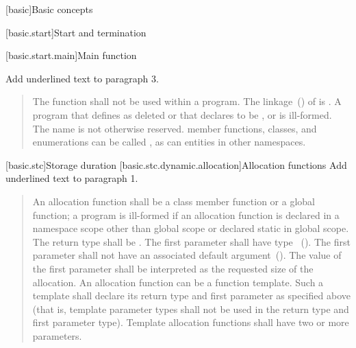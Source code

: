 
\setcounter{chapter}{2}
[basic]{Basic concepts}

\setcounter{section}{5}
[basic.start]{Start and termination}

[basic.start.main]{Main function}

Add underlined text to paragraph 3.


\begin{quote}
	\setcounter{Paras}{4}


The function  shall not be used within
a program.
%
The linkage~() of  is
. A program that defines  as
deleted or that declares  to be
 , or  is ill-formed. 
The name  is
not otherwise reserved. \enterexample member functions, classes, and
enumerations can be called , as can entities in other
namespaces. \exitexample
\end{quote}

\setcounter{section}{6}
[basic.stc]{Storage duration}
\setcounter{subsection}{4}
[basic.stc.dynamic.allocation]{Allocation functions}
Add underlined text to paragraph 1.

\begin{quote}
\pnum
{}%
An allocation function shall be a class member function or a global
function; a program is ill-formed if an allocation function is declared
in a namespace scope other than global scope or declared static in
global scope. The return type shall be . The first
parameter shall have type ~(). The
first parameter shall not have an associated default
argument~(). The value of the first parameter shall
be interpreted as the requested size of the allocation. An allocation
function can be a function template. Such a template shall declare its
return type and first parameter as specified above (that is, template
parameter types shall not be used in the return type and first parameter
type). Template allocation functions shall have two or more parameters.
\end{quote}